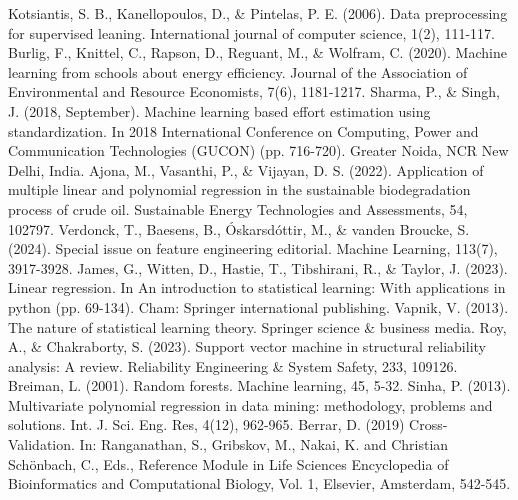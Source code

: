 \documentclass[12pt,a4paper]{article}
\begin{document}
\begin{enumerate}
\begin{thebibliography}{99}
 Kotsiantis, S. B., Kanellopoulos, D., \& Pintelas, P. E. (2006). Data preprocessing for supervised leaning. International journal of computer science, 1(2), 111-117.
 Burlig, F., Knittel, C., Rapson, D., Reguant, M., \& Wolfram, C. (2020). Machine learning from schools about energy efficiency. Journal of the Association of Environmental and Resource Economists, 7(6), 1181-1217.
 Sharma, P., \& Singh, J. (2018, September). Machine learning based effort estimation using standardization. In 2018 International Conference on Computing, Power and Communication Technologies (GUCON) (pp. 716-720).  Greater Noida, NCR New Delhi, India.
 Ajona, M., Vasanthi, P., \& Vijayan, D. S. (2022). Application of multiple linear and polynomial regression in the sustainable biodegradation process of crude oil. Sustainable Energy Technologies and Assessments, 54, 102797.
 Verdonck, T., Baesens, B., Óskarsdóttir, M., \& vanden Broucke, S. (2024). Special issue on feature engineering editorial. Machine Learning, 113(7), 3917-3928.
 James, G., Witten, D., Hastie, T., Tibshirani, R., \& Taylor, J. (2023). Linear regression. In An introduction to statistical learning: With applications in python (pp. 69-134). Cham: Springer international publishing.
 Vapnik, V. (2013). The nature of statistical learning theory. Springer science \& business media.
 Roy, A., \& Chakraborty, S. (2023). Support vector machine in structural reliability analysis: A review. Reliability Engineering \& System Safety, 233, 109126.
 Breiman, L. (2001). Random forests. Machine learning, 45, 5-32.
 Sinha, P. (2013). Multivariate polynomial regression in data mining: methodology, problems and solutions. Int. J. Sci. Eng. Res, 4(12), 962-965.
 Berrar, D. (2019) Cross-Validation. In: Ranganathan, S., Gribskov, M., Nakai, K. and Christian Schönbach, C., Eds., Reference Module in Life Sciences Encyclopedia of Bioinformatics and Computational Biology, Vol. 1, Elsevier, Amsterdam, 542-545.

\end{thebibliography}

\end{enumerate}	

\label{LastPage}
\end{document}
